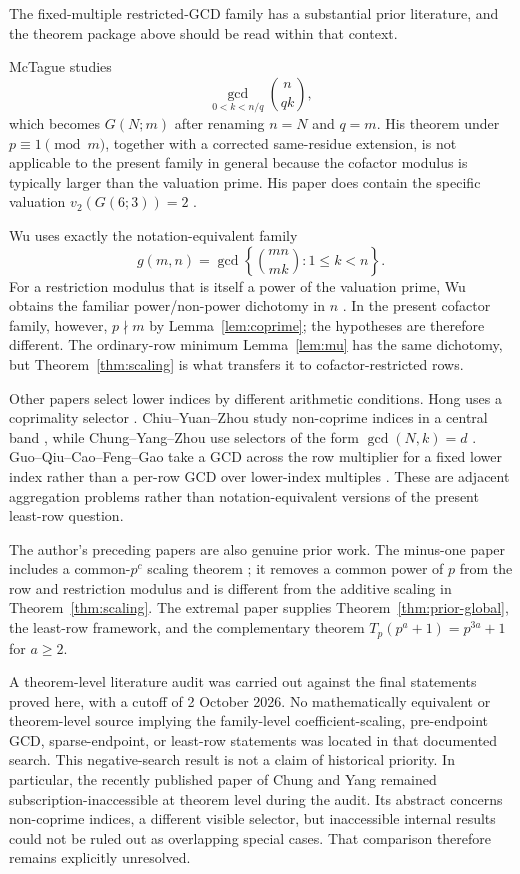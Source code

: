\documentclass[11pt]{article}
\theoremstyle{definition}
\theoremstyle{remark}
\begin{document}
The fixed-multiple restricted-GCD family has a substantial prior literature,
and the theorem package above should be read within that context.

McTague studies
\[
  \gcd_{0<k<n/q}\binom n{qk},
\]
which becomes \(G(N;m)\) after renaming \(n=N\) and \(q=m\).  His theorem under
\(p\equiv1\pmod m\), together with a corrected same-residue extension, is not
applicable to the present family in general because the cofactor modulus is
typically larger than the valuation prime.  His paper does contain the
specific valuation \(v_2(G(6;3))=2\) \cite{McTague2017}.

Wu uses exactly the notation-equivalent family
\[
  g(m,n)=\gcd\left\{\binom{mn}{mk}:1\le k<n\right\}.
\]
For a restriction modulus that is itself a power of the valuation prime, Wu
obtains the familiar power/non-power dichotomy in \(n\) \cite{Wu2026}.  In the
present cofactor family, however, \(p\nmid m\) by Lemma~\ref{lem:coprime}; the
hypotheses are therefore different.  The ordinary-row minimum
Lemma~\ref{lem:mu} has the same dichotomy, but
Theorem~\ref{thm:scaling} is what transfers it to cofactor-restricted rows.

Other papers select lower indices by different arithmetic conditions.  Hong
uses a coprimality selector \cite{Hong2016}.  Chiu--Yuan--Zhou study
non-coprime indices in a central band \cite{ChiuYuanZhou2023}, while
Chung--Yang--Zhou use selectors of the form \(\gcd(N,k)=d\)
\cite{ChungYangZhou2025}.  Guo--Qiu--Cao--Feng--Gao take a GCD across the row
multiplier for a fixed lower index rather than a per-row GCD over lower-index
multiples \cite{GuoEtAl2026}.  These are adjacent aggregation problems rather
than notation-equivalent versions of the present least-row question.

The author's preceding papers are also genuine prior work.  The minus-one
paper includes a common-\(p^c\) scaling theorem
\cite{FairfaxBallMinusOne2026}; it removes a common power of \(p\) from the row
and restriction modulus and is different from the additive scaling in
Theorem~\ref{thm:scaling}.  The extremal paper
\cite{FairfaxBallExtremes2026} supplies Theorem~\ref{thm:prior-global}, the
least-row framework, and the complementary theorem
\(T_p(p^a+1)=p^{3a}+1\) for \(a\ge2\).

A theorem-level literature audit was carried out against the final statements
proved here, with a cutoff of 2 October 2026.  No mathematically equivalent
or theorem-level source implying the family-level coefficient-scaling,
pre-endpoint GCD, sparse-endpoint, or least-row statements was located in that
documented search.  This negative-search result is not a claim of historical
priority.  In particular, the recently published paper of Chung and Yang
\cite{ChungYang2026} remained subscription-inaccessible at theorem level
during the audit.  Its abstract concerns non-coprime indices, a different
visible selector, but inaccessible internal results could not be ruled out as
overlapping special cases.  That comparison therefore remains explicitly
unresolved.
\end{document}

